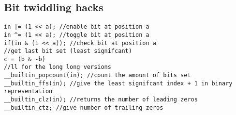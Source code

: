 \subsection{Bit twiddling hacks}
\begin{verbatim}
in |= (1 << a); //enable bit at position a
in ^= (1 << a); //toggle bit at position a
if(in & (1 << a)); //check bit at position a
//get last bit set (least signifcant)
c = (b & -b) 
//ll for the long long versions
__builtin_popcount(in); //count the amount of bits set
__builtin_ffs(in); //give the least signifcant index + 1 in binary representation
__builtin_clz(in); //returns the number of leading zeros
__builtin_ctz; //give number of trailing zeros
\end{verbatim}
